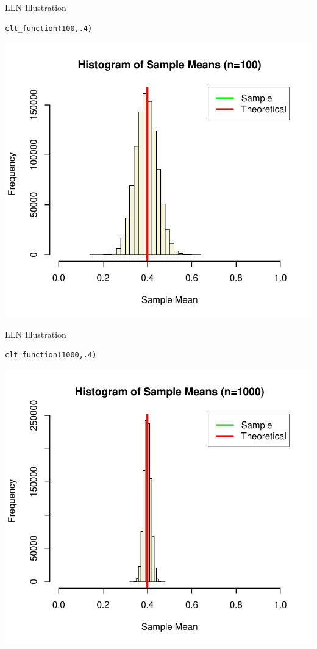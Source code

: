 \begin{frame}[fragile]{LLN Illustration}
\begin{lstlisting}
clt_function(100,.4)
\end{lstlisting}
\begin{center}
\includegraphics[height=.8\textheight]{clt100}
\end{center}
\end{frame}

\begin{frame}[fragile]{LLN Illustration}
\begin{lstlisting}
clt_function(1000,.4)
\end{lstlisting}
\begin{center}
\includegraphics[height=.8\textheight]{clt1000}
\end{center}
\end{frame}




